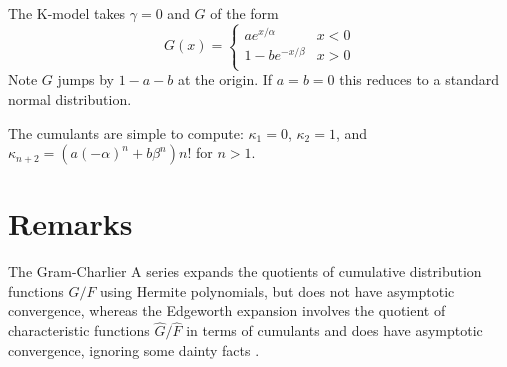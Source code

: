 \documentclass[11pt]{article}
\begin{document}
The K-model takes \(\gamma = 0\) and \(G\) of the form
\[
G(x) =
\begin{cases}
a e^{x/\alpha} &x < 0\\
1 - be^{-x/\beta} & x > 0\\
\end{cases}
\]
Note \(G\) jumps by \(1 - a - b\) at the origin. If \(a = b = 0\)
this reduces to a standard normal distribution.

The cumulants are simple to compute: \(\kappa_1 = 0\), \(\kappa_2 = 1\),
and \(\kappa_{n+2} = (a(-\alpha)^n + b\beta^n)n!\) for \(n > 1\).

\section{Remarks}
The Gram-Charlier A series expands the quotients of cumulative
distribution functions \(G/F\) using Hermite polynomials,
but does not have asymptotic convergence, whereas the Edgeworth expansion
involves the quotient of characteristic functions 
\(\hat G/\hat F\) in terms of cumulants and does have asymptotic convergence, ignoring some dainty facts \cite{Petrov}.
\end{document}

